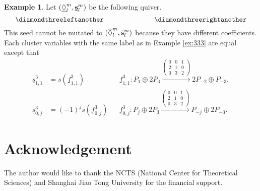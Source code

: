 \documentclass{amsart}
\theoremstyle{definition}
\newtheorem{example}[theorem]{Example}
\theoremstyle{remark}
\numberwithin{equation}{section}
\renewcommand{\b}[1]{\bold{#1}}
\newcommand{\br}[1]{\overline{#1}}
\newcommand{\sm}[1]{{\left(\begin{smallmatrix}#1\end{smallmatrix}\right)}}
\begin{document}
\begin{example} \label{ex:333another}
Let $({\underline{\Diamond}_l^m}, {\underline{\b{s}}_l^m})$ be the following quiver.
$$\diamondthreeleftanother \hspace{1in} \diamondthreerightanother$$
This seed cannot be mutated to $(\br{\Diamond}_l^m, \br{\b{s}}_l^m)$ because they have different coefficients.
Each cluster variables with the same label as in Example \ref{ex:333} are equal except that
\begin{align*}
\underline{s}_{1,1}^3&=s(\underline{f}_{1,1}^3) && \underline{f}_{1,1}^3: P_{1}\oplus 2P_3 \xrightarrow{\sm{0&0&1\\2&1&0\\0&3&2}} 2P_{-2}\oplus P_{-3}, \\
\underline{s}_{0,j}^3&=(-1)^{j}s(\underline{f}_{0,j}^3) && \underline{f}_{0,j}^3: P_{j}\oplus 2P_3 \xrightarrow{\sm{0&0&1\\2&1&0\\0&3&2}} P_{-j}\oplus 2P_{-3}.
\end{align*}
\end{example}



\section*{Acknowledgement}
The author would like to thank the NCTS (National Center for Theoretical Sciences) and Shanghai Jiao Tong University for the financial support.
\end{document}
